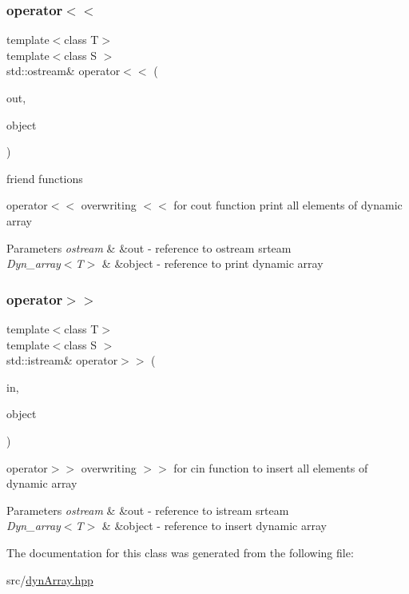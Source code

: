 \subsubsection{\texorpdfstring{operator$<$$<$}{operator<<}}
{\footnotesize\ttfamily template$<$class T$>$ \\
template$<$class S $>$ \\
std\+::ostream\& operator$<$$<$ (\begin{DoxyParamCaption}\item[{std\+::ostream \&}]{out,  }\item[{const \hyperlink{classDyn__array}{Dyn\+\_\+array}$<$ S $>$ \&}]{object }\end{DoxyParamCaption})\hspace{0.3cm}{\ttfamily [friend]}}



friend functions 

operator$<$$<$ overwriting $<$$<$ for cout function print all elements of dynamic array 
\begin{DoxyParams}{Parameters}
{\em ostream} & \&out -\/ reference to ostream srteam \\
\hline
{\em Dyn\+\_\+array$<$\+T$>$} & \&object -\/ reference to print dynamic array \\
\hline
\end{DoxyParams}
\mbox{\label{classDyn__array_a3b9156ade0a68fef20fc21e06aed9cc0}} 
\subsubsection{\texorpdfstring{operator$>$$>$}{operator>>}}
{\footnotesize\ttfamily template$<$class T$>$ \\
template$<$class S $>$ \\
std\+::istream\& operator$>$$>$ (\begin{DoxyParamCaption}\item[{std\+::istream \&}]{in,  }\item[{\hyperlink{classDyn__array}{Dyn\+\_\+array}$<$ S $>$ \&}]{object }\end{DoxyParamCaption})\hspace{0.3cm}{\ttfamily [friend]}}



operator$>$$>$ overwriting $>$$>$ for cin function to insert all elements of dynamic array 


\begin{DoxyParams}{Parameters}
{\em ostream} & \&out -\/ reference to istream srteam \\
\hline
{\em Dyn\+\_\+array$<$\+T$>$} & \&object -\/ reference to insert dynamic array \\
\hline
\end{DoxyParams}


The documentation for this class was generated from the following file\+:\begin{DoxyCompactItemize}
\item 
src/\hyperlink{dynArray_8hpp}{dyn\+Array.\+hpp}\end{DoxyCompactItemize}
